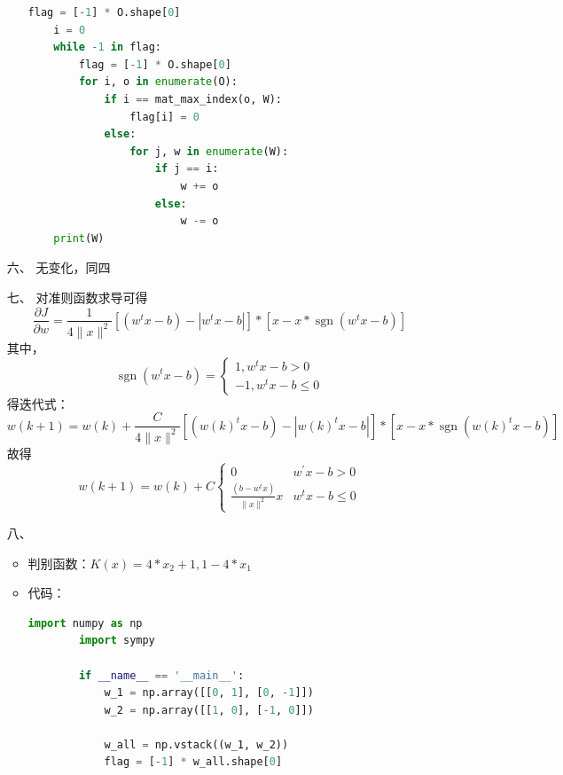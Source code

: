 \documentclass[UTF8,a4paper]{ctexart}
\begin{document}
\begin{itemize}
\begin{itemize}
\begin{lstlisting}[language={Python}]
    flag = [-1] * O.shape[0]
    i = 0
    while -1 in flag:
        flag = [-1] * O.shape[0]
        for i, o in enumerate(O):
            if i == mat_max_index(o, W):
                flag[i] = 0
            else:
                for j, w in enumerate(W):
                    if j == i:
                        w += o
                    else:
                        w -= o
    print(W)
    \end{lstlisting}
\end{itemize}
\item[六、] 无变化，同四
\item[七、] 对准则函数求导可得
$$
\frac{\partial J}{\partial w}=\frac{1}{4\|x\|^{2}}\left[\left(w^{t} x-b\right)-\left|w^{t} x-b\right|\right] *\left[x-x* \operatorname{sgn}\left(w^{t} x-b\right)\right]
$$
其中，$$
\operatorname{sgn}\left(w^{t} x-b\right)=\left\{\begin{array}{c}
1, w^{t} x-b>0 \\
-1, w^{t} x-b \leq 0
\end{array}\right.
$$
得迭代式：$$
w(k+1)=w(k)+\frac{C}{4\|x\|^{2}}\left[\left(w(k)^{t} x-b\right)-\left|w(k)^{t} x-b\right|\right]*\left[x-x*\operatorname{sgn}\left(w(k)^{t} x-b\right)\right]
$$
故得$$
w(k+1)=w(k)+C\left\{\begin{array}{ll}
0 & w^{\prime} x-b>0 \\
\frac{\left(b-w^{t} x\right)}{\|x\|^{2}} x & w^{t} x-b \leq 0
\end{array}\right.
$$
\item[八、]
\begin{itemize}
    \item 判别函数：$K(x) =4*x_2 + 1,1 - 4*x_1$
    \item 代码：
    \begin{lstlisting}[language={Python}]
        import numpy as np
        import sympy
        
        if __name__ == '__main__':
            w_1 = np.array([[0, 1], [0, -1]])
            w_2 = np.array([[1, 0], [-1, 0]])
        
            w_all = np.vstack((w_1, w_2))
            flag = [-1] * w_all.shape[0]
        

\end{lstlisting}
\end{itemize}
\end{itemize}
\end{document}
